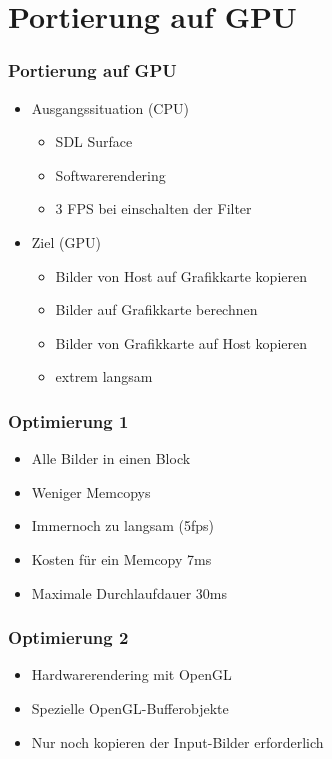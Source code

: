 \documentclass{beamer}
\begin{document}
\section{Portierung auf GPU}

\begin{frame}
\frametitle{Portierung auf GPU}
\begin{itemize}
\item Ausgangssituation (CPU)
	\begin{itemize}
		\item SDL Surface
		\item Softwarerendering
		\item 3 FPS bei einschalten der Filter
	\end{itemize}
\item Ziel (GPU)
	\begin{itemize}
		\item Bilder von Host auf Grafikkarte kopieren
		\item Bilder auf Grafikkarte berechnen
		\item Bilder von Grafikkarte auf Host kopieren
		\item extrem langsam 
	\end{itemize}
\end{itemize}
\end{frame}

\begin{frame}
\frametitle{Optimierung 1}
\begin{itemize}
\item Alle Bilder in einen Block
\item Weniger Memcopys
\item Immernoch zu langsam (5fps)
\item Kosten für ein Memcopy 7ms
\item Maximale Durchlaufdauer 30ms
\end{itemize}
\end{frame}

\begin{frame}
\frametitle{Optimierung 2}
\begin{itemize}
\item Hardwarerendering mit OpenGL
\item Spezielle OpenGL-Bufferobjekte
\item Nur noch kopieren der Input-Bilder erforderlich
\end{itemize}
\end{frame}
\end{document}
